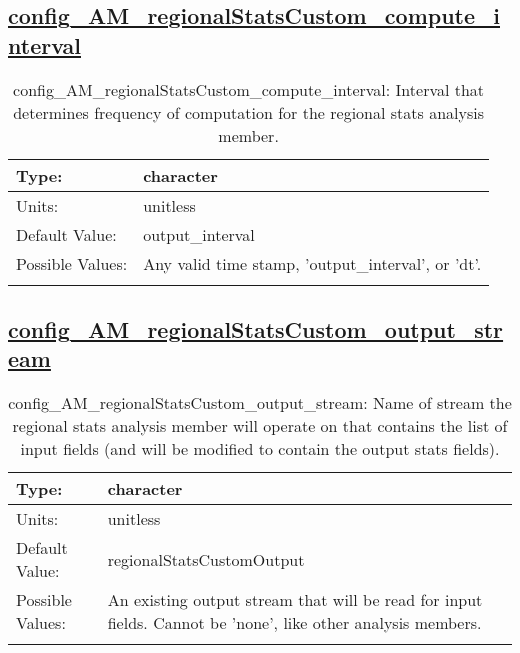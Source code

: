 \subsection[config\_AM\_regionalStatsCustom\_compute\_interval]{\hyperref[sec:nm_tab_AM_regionalStatsCustom]{config\_AM\_regionalStatsCustom\_compute\_interval}}
\label{subsec:nm_sec_config_AM_regionalStatsCustom_compute_interval}
\begin{center}
\begin{longtable}{| p{2.0in} || p{4.0in} |}
    \hline
    Type: & character \\
    \hline
    Units: & \si{unitless} \\
    \hline
    Default Value: & output\_interval \\
    \hline
    Possible Values: & Any valid time stamp, 'output\_interval', or 'dt'. \\
    \hline
    \caption{config\_AM\_regionalStatsCustom\_compute\_interval: Interval that determines frequency of computation for the regional stats analysis member.}
\end{longtable}
\end{center}
\subsection[config\_AM\_regionalStatsCustom\_output\_stream]{\hyperref[sec:nm_tab_AM_regionalStatsCustom]{config\_AM\_regionalStatsCustom\_output\_stream}}
\label{subsec:nm_sec_config_AM_regionalStatsCustom_output_stream}
\begin{center}
\begin{longtable}{| p{2.0in} || p{4.0in} |}
    \hline
    Type: & character \\
    \hline
    Units: & \si{unitless} \\
    \hline
    Default Value: & regionalStatsCustomOutput \\
    \hline
    Possible Values: & An existing output stream that will be read for input fields. Cannot be 'none', like other analysis members. \\
    \hline
    \caption{config\_AM\_regionalStatsCustom\_output\_stream: Name of stream the regional stats analysis member will operate on that contains the list of input fields (and will be modified to contain the output stats fields).}
\end{longtable}
\end{center}
